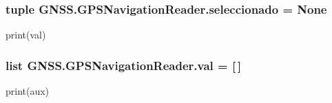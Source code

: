 \subsubsection[{seleccionado}]{\setlength{\rightskip}{0pt plus 5cm}tuple G\-N\-S\-S.\-G\-P\-S\-Navigation\-Reader.\-seleccionado = None}\label{namespaceGNSS_1_1GPSNavigationReader_a3e7d3dc4d7a7aec8adb22f931d405b17}


print(val) 

\subsubsection[{val}]{\setlength{\rightskip}{0pt plus 5cm}list G\-N\-S\-S.\-G\-P\-S\-Navigation\-Reader.\-val = [$\,$]}\label{namespaceGNSS_1_1GPSNavigationReader_a78f5940eafe8c790acf61c8b70554e75}


print(aux) 

